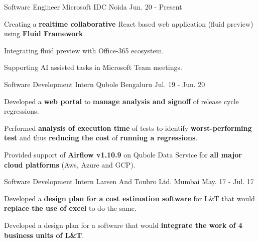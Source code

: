 

\begin{cventries}

  \cventry
    {Software Engineer} %
    {Microsoft IDC} %
    {Noida} %
    {Jun. 20 - Present} %
    {
      \begin{cvitems}
        \item{Creating a \textbf{realtime collaborative} React based web application
         (fluid preview) using \textbf{Fluid Framework}.}
        \item{Integrating fluid preview with Office-365 ecosystem.}
        \item{Supporting AI assisted tasks in Microsoft Team meetings.}
      \end{cvitems}
    }

  \cventry
    {Software Development Intern} %
    {Qubole} %
    {Bengaluru} %
    {Jul. 19 - Jun. 20} %
    {
      \begin{cvitems}
        \item {Developed a \textbf{web portal} to \textbf{manage analysis and signoff} of release cycle regressions.}
        \item {Performed \textbf{analysis of execution time} of tests to identify \textbf{worst-performing test}
         and thus \textbf{reducing the cost} of \textbf{running a regressions}.}
        \item {Provided support of \textbf{Airflow v1.10.9} on Qubole Data Service for
         \textbf{all major cloud platforms} (Aws, Azure and GCP).}
      \end{cvitems}
    }

  \cventry
    {Software Development Intern} %
    {Larsen And Toubro Ltd.} %
    {Mumbai} %
    {May. 17 - Jul. 17} %
    {
      \begin{cvitems}
        \item {Developed a \textbf{design plan for a cost estimation software} for L\&T that
         would \textbf{replace the use of excel} to do the same.}
        \item {Developed a design plan for a software that would \textbf{integrate the
         work of 4 business units of L\&T}.}
      \end{cvitems}
    }

\end{cventries}
